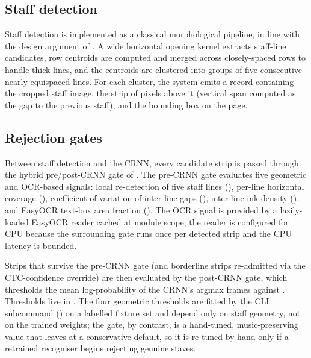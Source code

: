 \subsection{Staff detection}

Staff detection is implemented as a classical morphological pipeline,
in line with the design argument of .
A wide horizontal opening kernel extracts staff-line candidates, row
centroids are computed and merged across closely-spaced rows to handle
thick lines, and the centroids are clustered into groups of five
consecutive nearly-equispaced lines.
For each cluster, the system emits a  record containing
the cropped staff image, the strip of pixels above it (vertical span
computed as the gap to the previous staff), and the bounding box on
the page.

\subsection{Rejection gates}

Between staff detection and the CRNN, every candidate strip is passed
through the hybrid pre/post-CRNN gate of
.
The pre-CRNN gate evaluates five geometric and OCR-based signals:
local re-detection of five staff lines
(),
per-line horizontal coverage (),
coefficient of variation of inter-line gaps
(),
inter-line ink density (),
and EasyOCR text-box area fraction
().
The OCR signal is provided by a lazily-loaded EasyOCR reader cached at
module scope; the reader is configured for CPU because the surrounding
gate runs once per detected strip and the CPU latency is bounded.

Strips that survive the pre-CRNN gate (and borderline strips
re-admitted via the CTC-confidence override) are then evaluated by
the post-CRNN gate, which thresholds the mean log-probability of the
CRNN's argmax frames against .
Thresholds live in .
The four geometric thresholds are fitted by the 
CLI subcommand () on a labelled fixture set and depend
only on staff geometry, not on the trained weights; the
 gate, by contrast, is a hand-tuned,
music-preserving value that  leaves at a
conservative default, so it is re-tuned by hand only if a retrained
recogniser begins rejecting genuine staves.

